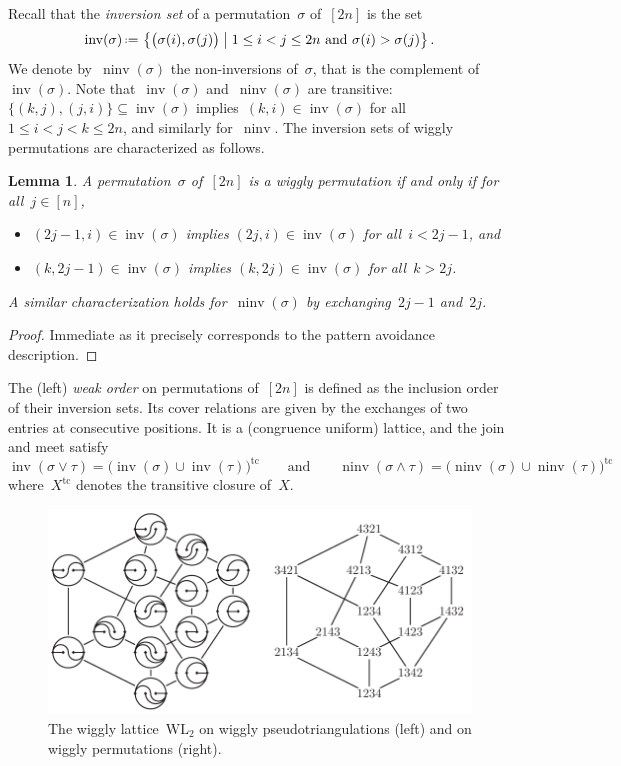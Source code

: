 \documentclass{amsart}
\newtheorem{lemma}[theorem]{Lemma}
\theoremstyle{definition}
\newcommand{\set}[2]{\left\{ #1 \;\middle|\; #2 \right\}} %
\newcommand{\eqdef}{\mbox{\,\raisebox{0.2ex}{\scriptsize\ensuremath{\mathrm:}}\ensuremath{=}\,}} %
\DeclareMathOperator{\inv}{inv} %
\DeclareMathOperator{\ninv}{ninv} %
\newcommand{\darkblue}{\color{darkblue}} %
\newcommand{\defn}[1]{\textsl{\darkblue #1}} %
\newcommand{\meet}{\wedge} %
\newcommand{\join}{\vee} %
\newcommand{\wigglyLattice}{\mathrm{WL}} %
\begin{document}
Recall that the \defn{inversion set} of a permutation~$\sigma$ of~$[2n]$ is the set
\[
\inv(\sigma) \eqdef \set{\big( \sigma(i), \sigma(j) \big)}{1 \le i < j \le 2n \text{ and } \sigma(i) > \sigma(j)}.
\]
We denote by~$\ninv(\sigma)$ the non-inversions of~$\sigma$, that is the complement of~$\inv(\sigma)$.
Note that~$\inv(\sigma)$ and~$\ninv(\sigma)$ are transitive: $\{(k,j), (j,i)\} \subseteq \inv(\sigma)$ implies~$(k,i) \in \inv(\sigma)$ for all~${1 \le i < j < k \le 2n}$, and similarly for~$\ninv$.
The inversion sets of wiggly permutations are characterized as follows.

\begin{lemma}
\label{lem:inversionSetsWigglyPermutations}
A permutation~$\sigma$ of~$[2n]$ is a wiggly permutation if and only if for all~$j \in [n]$,
\begin{itemize}
\item $(2j-1, i) \in \inv(\sigma)$ implies $(2j, i) \in \inv(\sigma)$ for all~$i < 2j-1$, and
\item $(k, 2j-1) \in \inv(\sigma)$ implies $(k, 2j) \in \inv(\sigma)$ for all~$k > 2j$.
\end{itemize}
A similar characterization holds for~$\ninv(\sigma)$ by exchanging~$2j-1$ and~$2j$.
\end{lemma}

\begin{proof}
Immediate as it precisely corresponds to the pattern avoidance description.
\end{proof}

The (left) \defn{weak order} on permutations of~$[2n]$ is defined as the inclusion order of their inversion sets.
Its cover relations are given by the exchanges of two entries at consecutive positions.
It is a (congruence uniform) lattice, and the join and meet satisfy
\[
\inv(\sigma \join \tau) = \big( \inv(\sigma) \cup \inv(\tau) \big)^\textrm{tc}
\qquad\text{and}\qquad
\ninv(\sigma \meet \tau) = \big( \ninv(\sigma) \cup \ninv(\tau) \big)^\textrm{tc}
\]
where~$X^\mathrm{tc}$ denotes the transitive closure of~$X$.

%
\begin{figure}
\centerline{\includegraphics[scale=1.1]{wigglyFlipGraph}}
\caption{The wiggly lattice~$\wigglyLattice_2$ on wiggly pseudotriangulations (left) and on wiggly permutations (right).}
\label{fig:wigglyLattice}
\end{figure}
\end{document}
